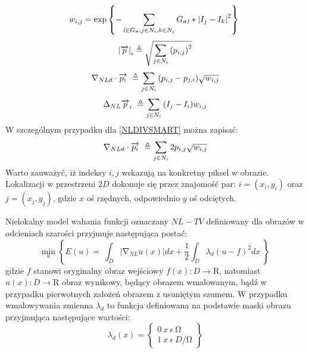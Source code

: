 \documentclass[12pt, twoside, openany]{report}
\theoremstyle{definition}
\begin{document}
\begin{equation}
w_{i,j}={\mathrm{exp} \left\{-\sum_{l\in G_{\sigma },j\in N_i,k\in N_j \\
}{{G_{\sigma }}_l\ast {\left|I_j-I_k\right|}^2}\right\}\ }
\label{DNLWEIGHT}
\end{equation}
\begin{equation}
{\left|\overrightarrow{p}\right|}_i\triangleq \sqrt{\sum_{j\in N_i \\ 
}{{\left(p_{i,j}\right)}^2}}
\label{DNLMAG}
\end{equation}
\begin{equation}
{\mathrm{\nabla }}_{NLd}\cdot \overrightarrow{p_i}\ \triangleq \sum_{ 
j\in N_i \\ 
}{\left(p_{i,j}-p_{j,i}\right)}\sqrt{w_{i,j}}
\label{DNLDIV}
\end{equation}
\begin{equation}
{\mathrm{\Delta }}_{NL}{\overrightarrow{p}}_i\ \triangleq \sum_{
j\in N_i \\ 
}{\left(I_j-I_i\right)}w_{i,j}
\label{DNLLAP}
\end{equation}
W szczególnym przypadku dla \eqref{NLDIVSMART} można zapisać:
\begin{equation}
{\mathrm{\nabla }}_{NLd}\cdot \overrightarrow{p_i}\ \triangleq \sum_{ 
j\in N_i \\ 
}{2p_{i,j}}\sqrt{w_{i,j}}
\label{DNLDIVSMART}
\end{equation}
Warto zauważyć, iż indeksy $i,j$ wskazują na konkretny piksel w obrazie. Lokalizacji w przestrzeni $2D$ dokonuje się przez znajomość par: $i=(x_i,y_i)$ oraz $j=(x_j,y_j)$, gdzie $x$ oś rzędnych, odpowiednio $y$ oś odciętych.
\par 
Nielokalny model wahania funkcji oznaczany $NL-TV$ definiowany dla obrazów w odcieniach szarości przyjmuje następująca postać:
\begin{equation}
{\mathop{\mathrm{min}}_{u} \left\{E\left(u\right)=\ \int_D{\left|{\mathrm{\nabla }}_{NL}u(x)\right|}dx+\frac{1}{2}\int_D{{\lambda }_d{\left(u-f\right)}^2}dx\ \right\}\ }
\label{NLTVGRAY}
\end{equation}
gdzie $f$ stanowi oryginalny obraz wejściowy $f\left(x\right):D\mathrm{\longrightarrow }\mathrm{R}$, natomiast $u\left(x\right):D\mathrm{\longrightarrow }\mathrm{R}$ obraz wynikowy, będący obrazem wmalowanym, bądź w przypadku pierwotnych założeń obrazem z usuniętym szumem. W przypadku wmalowywania zmienna ${\lambda }_d$ to funkcja definiowana na podstawie maski obrazu przyjmująca następujące wartości:
\begin{equation}
{\lambda }_d\left(x\right)=\left\{ \begin{array}{c}
0\ x\ \epsilon \ \mathrm{\Omega } \\ 
1\ x\ \epsilon \ D/\mathrm{\Omega } \end{array}
\right\}
\end{equation}
\end{document}
